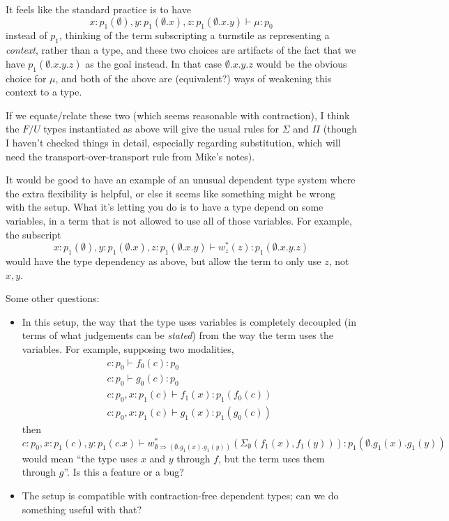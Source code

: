 \documentclass[10pt]{article}
\begin{document}
It feels like the standard practice is to have 
\[
x : p_1(\emptyset), y : p_1(\emptyset.x), z : p_1(\emptyset.x.y) \vdash \mu : p_0
\]
instead of $p_1$, thinking of the term subscripting a turnstile as
representing a \emph{context}, rather than a type, and these two choices
are artifacts of the fact that we have $p_1(\emptyset.x.y.z)$ as the
goal instead.  In that case $\emptyset.x.y.z$ would be the obvious
choice for $\mu$, and both of the above are (equivalent?) ways of
weakening this context to a type.

If we equate/relate these two (which seems reasonable with contraction),
I think the $F/U$ types instantiated as above will give the usual rules
for $\Sigma$ and $\Pi$ (though I haven't checked things in detail,
especially regarding substitution, which will need the 
transport-over-transport rule from Mike's notes).  

It would be good to have an example of an unusual dependent type system
where the extra flexibility is helpful, or else it seems like something
might be wrong with the setup.  What it's letting you do is to have a
type depend on some variables, in a term that is not allowed to use all
of those variables.  For example, the subscript
\[
x : p_1(\emptyset), y : p_1(\emptyset.x), z : p_1(\emptyset.x.y) \vdash w_{z}^*(z) : p_1(\emptyset.x.y.z) 
\]
would have the type dependency as above, but allow the term to only use
$z$, not $x,y$.  

Some other questions:
\begin{itemize}

\item In this setup, the way that the type uses variables is completely
  decoupled (in terms of what judgements can be \emph{stated}) from the
  way the term uses the variables.  For example, supposing two
  modalities,
  \begin{align*}
    c : p_0 \vdash f_0(c) : p_0 \\
    c : p_0 \vdash g_0(c) : p_0 \\
    c : p_0, x : p_1(c) \vdash f_1(x) : p_1(f_0(c)) \\
    c : p_0, x : p_1(c) \vdash g_1(x) : p_1(g_0(c))
  \end{align*}
  then
  \[
  c : p_0, x : p_1(c), y : p_1(c.x) \vdash w_{\emptyset \Rightarrow
    (\emptyset.g_1(x).g_1(y))}^*(\Sigma_{\emptyset}(f_1(x),f_1(y))) :
  p_1(\emptyset.g_1(x).g_1(y))
  \]
  would mean ``the type uses $x$ and $y$ through $f$, but the term uses
  them through $g$''.  Is this a feature or a bug?  
  
\item The setup is compatible with contraction-free dependent types; can
  we do something useful with that?

\end{itemize}
\end{document}
